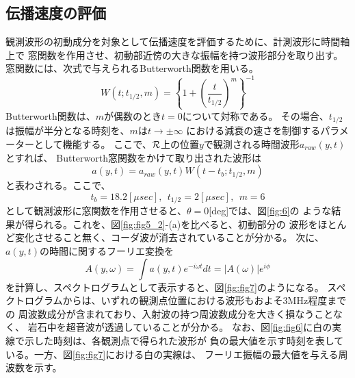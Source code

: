 \subsection{伝播速度の評価}
観測波形の初動成分を対象として伝播速度を評価するために、計測波形に時間軸上で
窓関数を作用させ、初動部近傍の大きな振幅を持つ波形部分を取り出す。
窓関数には、次式で与えられるButterworth関数を用いる。
\begin{equation}
	W(t;t_{1/2},m)=
	\left\{
		1+\left(\frac{t}{t_{1/2}}\right)^m
	\right\}^{-1}
	\label{eqn:Butterworth}
\end{equation}
Butterworth関数は、$m$が偶数のとき$t=0$について対称である。
その場合、$t_{1/2}$は振幅が半分となる時刻を、$m$は$t\rightarrow \pm \infty$
における減衰の速さを制御するパラメーターとして機能する。
ここで、$\cal R$上の位置$y$で観測される時間波形$a_{raw}(y,t)$とすれば、
Butterworth窓関数をかけて取り出された波形は
\begin{equation}
	a(y,t)=a_{raw}(y,t)W(t-t_b;t_{1/2},m)
\end{equation}
と表わされる。ここで、
\[
	t_b=18.2[\mu sec], \ \ t_{1/2}=2[\mu sec], \ \ m=6
\]
として観測波形に窓関数を作用させると、$\theta=0$[deg]では、図\ref{fig:6}の
ような結果が得られる。これを、図\ref{fig:fig5_2}-(a)を比べると、初動部分の
波形をほとんど変化させること無く、コーダ波が消去されていることが分かる。
次に、$a(y,t)$の時間に関するフーリエ変換を
\begin{equation}
	A(y, \omega)=\int a(y, t)e^{-i\omega t}dt=\left| A(\omega) \right|e^{i\phi}
	\label{eqn:def_FFT}
\end{equation}
を計算し、スペクトログラムとして表示すると、図\ref{fig:fig7}のようになる。
スペクトログラムからは、いずれの観測点位置における波形もおよそ3MHz程度までの
周波数成分が含まれており、入射波の持つ周波数成分を大きく損なうことなく、
岩石中を超音波が透過していることが分かる。
なお、図\ref{fig:fig6}に白の実線で示した時刻は、各観測点で得られた波形が
負の最大値を示す時刻を表している。一方、図\ref{fig:fig7}における白の実線は、
フーリエ振幅の最大値を与える周波数を示す。


